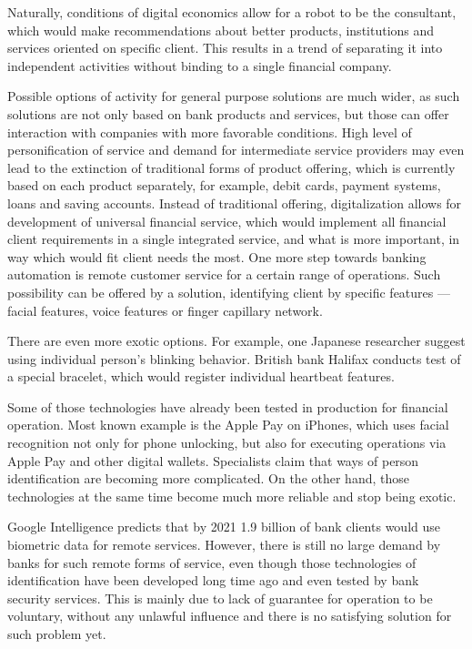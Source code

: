 Naturally, conditions of digital economics allow for a robot to be the consultant, which would make recommendations about better products, institutions and services oriented on specific client.
This results in a trend of separating it into independent activities without binding to a single financial company.

Possible options of activity for general purpose solutions are much wider, as such solutions are not only based on bank products and services, but those can offer interaction with companies with more favorable conditions.
High level of personification of service and demand for intermediate service providers may even lead to the extinction of traditional forms of product offering, which is currently based on each product separately, for example, debit cards, payment systems, loans and saving accounts.
Instead of traditional offering, digitalization allows for development of universal financial service, which would implement all financial client requirements in a single integrated service, and what is more important, in way which would fit client needs the most.
One more step towards banking automation is remote customer service for a certain range of operations.
Such possibility can be offered by a solution, identifying client by specific features — facial features, voice features or finger capillary network.

There are even more exotic options. 
For example, one Japanese researcher suggest using individual person's blinking behavior.
British bank Halifax conducts test of a special bracelet, which would register individual heartbeat features.
\cite{ways_ai_transforming_bi}

Some of those technologies have already been tested in production for financial operation. Most known example is the Apple Pay on iPhones, which uses facial recognition not only for phone unlocking, but also for executing operations via Apple Pay and other digital wallets.
Specialists claim that ways of person identification are becoming more complicated. 
On the other hand, those technologies at the same time become much more reliable and stop being exotic.

Google Intelligence predicts that by 2021 1.9 billion of bank clients would use biometric data for remote services.
However, there is still no large demand by banks for such remote forms of service, even though those technologies of identification have been developed long time ago and even tested by bank security services.
This is mainly due to lack of guarantee for operation to be voluntary, without any unlawful influence and there is no satisfying solution for such problem yet.
